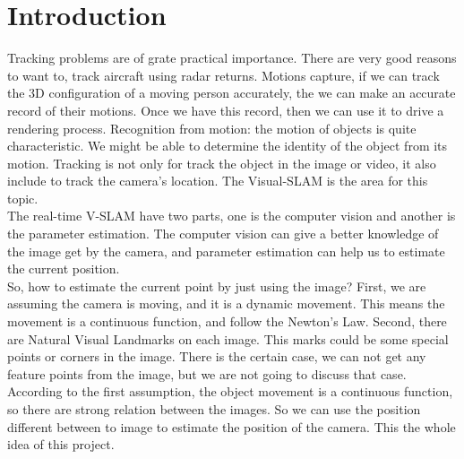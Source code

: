 \documentclass[10pt, conference, compsocconf]{IEEEtran}
\begin{document}
%




%
\IEEEpeerreviewmaketitle

\section{Introduction}
Tracking problems are of grate practical importance. There are very good reasons to want to, track aircraft  using radar returns. Motions capture, if we can track the 3D configuration of a moving person accurately, the we can make an accurate record of their motions. Once we have this record, then we can use it to drive a rendering process. Recognition from motion: the motion of objects is quite characteristic. We might be able to determine the identity of the object from its motion. Tracking is not only for track the object in the image or video, it also include to track the camera's location. The Visual-SLAM is the area for this topic. \\
The real-time V-SLAM have two parts, one is the computer vision and another is the parameter estimation. The computer vision can give a better knowledge of the image get by the camera, and parameter estimation can help us to estimate the current position. \\
So, how to estimate the current point by just using the image? First, we are assuming the camera is moving, and it is a dynamic movement. This means the movement is a continuous function, and follow the Newton's Law. Second, there are Natural Visual Landmarks on each image. This marks could be some special points or corners in the image. There is the certain case, we can not get any feature points from the image, but we are not going to discuss that case. According to the first assumption, the object movement is a continuous function, so there are strong relation between the images. So we can use the position different between to image to estimate the position of the camera. This the whole idea of this project. 
\end{document}
